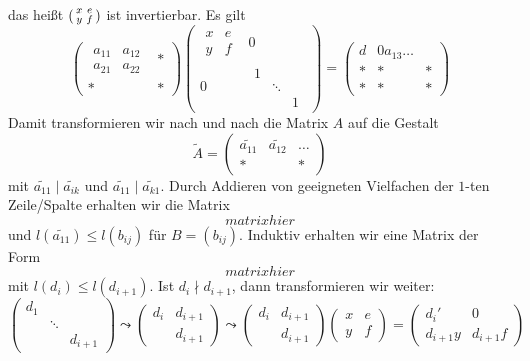 das heißt $\begin{psmallmatrix}
	x & e \\
	y & f
\end{psmallmatrix}$ ist invertierbar. Es gilt 
\[
	\begin{pmatrix}
		\begin{smallmatrix}
			a_{11} & a_{12} \\
			a_{21} & a_{22}
		\end{smallmatrix} & * \\
		* & *
	\end{pmatrix} \begin{pmatrix}
		\begin{smallmatrix}
			x & e \\
			y & f
		\end{smallmatrix} & 0 \\
		0 & \begin{smallmatrix}
			1  & & \\
			& \ddots & \\
			& & 1
		\end{smallmatrix}
	\end{pmatrix} = 
	\begin{pmatrix}
		d & 0 a_{13} \ldots  \\
		* & * & * \\
		* & * & * 
	\end{pmatrix}
\]
Damit transformieren wir nach und nach die Matrix $A$ auf die Gestalt
\[
	\tilde{A} = \begin{pmatrix}
		\tilde{a_{11}} & \tilde{a_{12}} & \ldots \\
		* & & *
	\end{pmatrix}
\]
mit $\tilde{a_{11}} \mid \tilde{a_{ik}}$ und $\tilde{a_{11}} \mid \tilde{a_{k1}}$. Durch Addieren von geeigneten Vielfachen der $1$-ten Zeile/Spalte erhalten wir die 
Matrix 
\[
	matrix hier
\]
und $l(\tilde{a_11}) \le l (b_{ij})$ für $B= (b_{ij})$. Induktiv erhalten wir eine Matrix der Form
\[
	matrix hier
\]
mit $l(d_i) \le l(d_{i+1})$. Ist $d_i \nmid d_{i+1}$, dann transformieren wir weiter:
\[
	\begin{pmatrix}
		d_1 & & \\
		& \ddots & \\
		& & d_{i+1}
	\end{pmatrix} \leadsto \begin{pmatrix}
		d_i & d_{i+1} \\
		& d_{i+1}
	\end{pmatrix} \leadsto \begin{pmatrix}
		d_i & d_{i+1} \\
		& d_{i+1}
	\end{pmatrix} \begin{pmatrix}
		x & e \\
		y & f
	\end{pmatrix} = \begin{pmatrix}
		d_i' & 0 \\
		d_{i+1}y & d_{i+1} f
	\end{pmatrix}
\]

